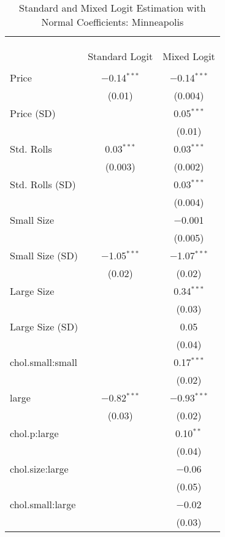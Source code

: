 
\begin{table}[!htbp] \centering 
  \caption{Standard and Mixed Logit Estimation with Normal Coefficients: Minneapolis} 
  \label{tab:mnlMinneapolisBaseline} 
\begin{tabular}{@{\extracolsep{5pt}}lcc} 
\\[-1.8ex]\hline 
\hline \\[-1.8ex] 
\\[-1.8ex] & \multicolumn{2}{c}{} \\ 
 & Standard Logit & Mixed Logit \\ 
\hline \\[-1.8ex] 
 Price & $-$0.14$^{***}$ & $-$0.14$^{***}$ \\ 
  & (0.01) & (0.004) \\ 
  Price (SD) &  & 0.05$^{***}$ \\ 
  &  & (0.01) \\ 
  Std. Rolls & 0.03$^{***}$ & 0.03$^{***}$ \\ 
  & (0.003) & (0.002) \\ 
  Std. Rolls (SD) &  & 0.03$^{***}$ \\ 
  &  & (0.004) \\ 
  Small Size &  & $-$0.001 \\ 
  &  & (0.005) \\ 
  Small Size (SD) & $-$1.05$^{***}$ & $-$1.07$^{***}$ \\ 
  & (0.02) & (0.02) \\ 
  Large Size &  & 0.34$^{***}$ \\ 
  &  & (0.03) \\ 
  Large Size (SD) &  & 0.05 \\ 
  &  & (0.04) \\ 
  chol.small:small &  & 0.17$^{***}$ \\ 
  &  & (0.02) \\ 
  large & $-$0.82$^{***}$ & $-$0.93$^{***}$ \\ 
  & (0.03) & (0.02) \\ 
  chol.p:large &  & 0.10$^{**}$ \\ 
  &  & (0.04) \\ 
  chol.size:large &  & $-$0.06 \\ 
  &  & (0.05) \\ 
  chol.small:large &  & $-$0.02 \\ 
  &  & (0.03) \\ 

\end{tabular}
\end{table}
